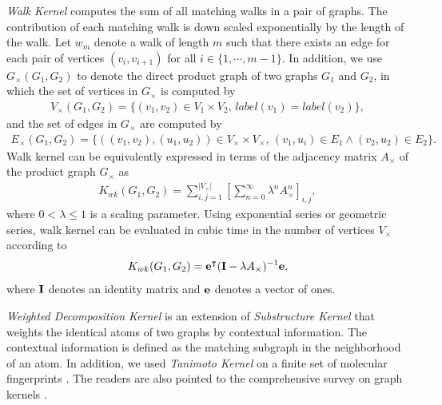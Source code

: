 {%
\textit{Walk Kernel} \citep{Kashima03marginalized,Gartner03a} computes the sum of all matching walks in a pair of graphs. 
The contribution of each matching walk is down scaled exponentially by the length of the walk.
Let $w_m$ denote a walk of length $m$ such that there exists an edge for each pair of vertices $(v_i,v_{i+1})$ for all $i\in\{1,\cdots,m-1\}$.
In addition, we use $G_{\times}(G_1,G_2)$ to denote the direct product graph of two graphs $G_1$ and $G_2$, in which the set of vertices in $G_{\times}$ is computed by 
\begin{align*}
	V_{\times}(G_1,G_2) = \{(v_1,v_2)\in V_1\times V_2,\, label(v_1)=label(v_2)\},
\end{align*}
and the set of edges in $G_{\times}$ are computed by
\begin{align*}
	E_{\times}(G_1,G_2) = \{((v_1,v_2),(u_1,u_2))\in V_{\times}\times V_{\times},\, (v_1,u_i)\in E_1\wedge (v_2,u_2)\in E_2\}.
\end{align*}
Walk kernel can be equivalently expressed in terms of the adjacency matrix $A_{\times}$ of the product graph $G_{\times}$ as
\begin{align*}
	K_{wk}(G_1,G_2) = \sum_{i,j=1}^{|V_{\times}|}\left[\sum_{n=0}^{\infty}\lambda^{n}A_{\times}^n\right]_{i,j},
\end{align*}
where $0<\lambda\le1$ is a scaling parameter.
Using exponential series or geometric series, walk kernel can be evaluated in cubic time \citep{Gartner03a} in the number of vertices $V_{\times}$ according to
\begin{align*}
	K_{wk}(G_1,G_2) = \mathbf {e}^{\intercal}(\mathbf{I}-\lambda A_{\times})^{-1}\mathbf {e},
\end{align*}
where $\mathbf{I}$ denotes an identity matrix and $\mathbf {e}$ denotes a vector of ones.

\textit{Weighted Decomposition Kernel} \citep{Menchetti05weighted,Ceroni08classification} is an extension of \textit{Substructure Kernel} \citep{Haussler99convolution} that weights the identical atoms of two graphs by contextual information.
The contextual information is defined as the matching subgraph in the neighborhood of an atom.
In addition, we used \textit{Tanimoto Kernel} \citep{Ralaivola05graph} on a finite set of molecular fingerprints \citep{Wang09pubchem}.
The readers are also pointed to the comprehensive survey on graph kernels \citep{Vishwanathan10graph}.

}

